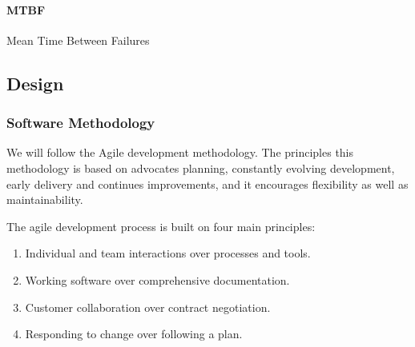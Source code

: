 			\paragraph{MTBF} Mean Time Between Failures

\subsection{Design}

	\subsubsection{Software Methodology}
	We will follow the Agile development methodology. The principles this methodology is based on advocates planning, constantly evolving development, early delivery and continues improvements, and it encourages flexibility as well as maintainability.

	\begin{flushleft}
	The agile development process is built on four main principles:
		\begin{enumerate}
			\item Individual and team interactions over processes and tools.
			\item Working software over comprehensive documentation.
			\item Customer collaboration over contract negotiation.
			\item Responding to change over following a plan.
		\end{enumerate}
	\end{flushleft}

